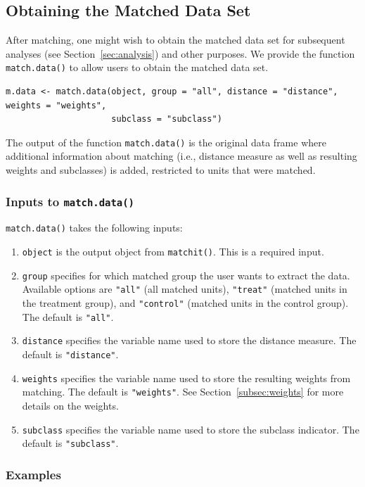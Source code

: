 \documentclass[oneside,letterpaper,titlepage]{article}
\begin{document}
\subsection{Obtaining the Matched Data Set}
\label{subsec:match.data}

After matching, one might wish to obtain the matched data set for
subsequent analyses (see Section~\ref{sec:analysis}) and other
purposes. We provide the function {\tt match.data()} to allow users to
obtain the matched data set.
\begin{verbatim}
m.data <- match.data(object, group = "all", distance = "distance", weights = "weights",
                     subclass = "subclass")
\end{verbatim}
The output of the function {\tt match.data()} is the original data
frame where additional information about matching (i.e., distance
measure as well as resulting weights and subclasses) is added,
restricted to units that were matched.

\subsubsection{Inputs to {\tt match.data()}}

{\tt match.data()} takes the following inputs:
\begin{enumerate}
\item {\tt object} is the output object from {\tt matchit()}. This is
  a required input.
\item {\tt group} specifies for which matched group the user wants to
  extract the data. Available options are {\tt "all"} (all matched
  units), {\tt "treat"} (matched units in the treatment group), and
  {\tt "control"} (matched units in the control group). The default is
  {\tt "all"}.
\item {\tt distance} specifies the variable name used to store the
  distance measure. The default is {\tt "distance"}.
\item {\tt weights} specifies the variable name used to store the
  resulting weights from matching. The default is {\tt "weights"}. See
  Section~\ref{subsec:weights} for more details on the weights.
\item {\tt subclass} specifies the variable name used to store the
  subclass indicator. The default is {\tt "subclass"}.
\end{enumerate}

\subsubsection{Examples}
\end{document}
